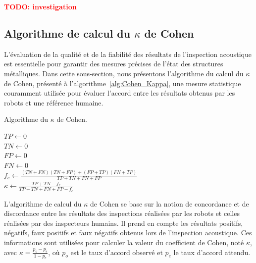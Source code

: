 \documentclass[francais,RandD]{rapportPFE}
\newcommand{\TODO}[1]{\textcolor{red}{\textbf{TODO: #1}}}
\begin{document}
			\TODO{investigation}
		\subsection*{Algorithme de calcul du $\kappa$ de Cohen}
			L'évaluation de la qualité et de la fiabilité des résultats de l'inspection acoustique est essentielle pour garantir des mesures précises de l'état des structures métalliques.
			Dans cette sous-section, nous présentons l'algorithme du calcul du $\kappa$ de Cohen, présenté à l'algorithme~\ref{alg:Cohen_Kappa}, une mesure statistique couramment utilisée pour évaluer l'accord entre les résultats obtenus par les robots et une référence humaine.

			\begin{algorithm}[h!]
				\caption{Algorithme du $\kappa$ de Cohen.}
				\label{alg:Cohen_Kappa}
				\KwResult{$\kappa \in [0, 1]$}
				$TP \gets 0$ \\
				$TN \gets 0$ \\
				$FP \gets 0$ \\
				$FN \gets 0$ \\
				$f_c \gets \frac{(TN + FN) (TN + FP) + (FP + TP) (FN + TP)}{TP + TN + FN +FP}$ \\
				$\kappa \gets \frac{TP + TN - f_c}{TP + TN + FN + FP - f_c}$
			\end{algorithm}

			L'algorithme de calcul du $\kappa$ de Cohen se base sur la notion de concordance et de discordance entre les résultats des inspections réalisées par les robots et celles réalisées par des inspecteurs humains.
			Il prend en compte les résultats positifs, négatifs, faux positifs et faux négatifs obtenus lors de l'inspection acoustique.
			Ces informations sont utilisées pour calculer la valeur du coefficient de Cohen, noté $\kappa$, avec $\kappa = \frac{p_o - p_e}{1 - p_e}$, où $p_o$ est le taux d'accord observé et $p_e$ le taux d'accord attendu.
\end{document}
